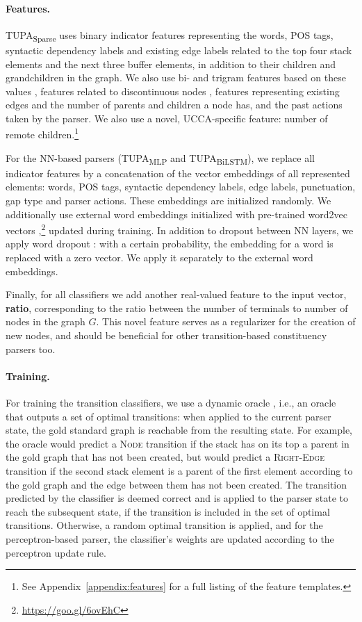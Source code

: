 \documentclass[11pt,a4paper]{article}
\newcommand{\parser}[1]{TUPA\textsubscript{#1}}
\begin{document}
\paragraph{Features.}
\parser{Sparse} uses binary indicator features representing
the words, POS tags, syntactic dependency labels and
existing edge labels related to the top four stack elements and the 
next three buffer elements, in addition to their children and grandchildren in the graph.
We also use bi- and trigram features based on these values \cite{zhang2009transition,zhu2013fast},
features related to discontinuous nodes
\cite[including separating punctuation and gap type]{maier2015discontinuous},
features representing existing edges and the number of parents and children a node has,
and the past actions taken by the parser.
We also use a novel, UCCA-specific feature:
number of remote children.\footnote{See
Appendix~\ref{appendix:features} for a full listing of the feature templates.}

For the NN-based parsers (\parser{MLP} and \parser{BiLSTM}),
we replace all indicator features by a
concatenation of the vector embeddings of all represented elements:
words, POS tags, syntactic dependency labels, edge labels, punctuation, gap type and parser actions.
These embeddings are initialized randomly.
We additionally use external word embeddings initialized with
pre-trained word2vec vectors \cite{mikolov2013efficient},\footnote{\url{
https://goo.gl/6ovEhC}} updated during training.
In addition to dropout between NN layers, we apply word dropout 
\cite{kiperwasser2016simple}: with a certain probability, the embedding for a
word is replaced with a zero vector. We apply it separately to the external
word embeddings.

Finally, for all classifiers we add another real-valued feature to the input vector,
\textbf{ratio}, corresponding to the ratio between the number of terminals to number of nodes
in the graph $G$.
This novel feature serves as a regularizer for the creation of new nodes,
and should be beneficial for other transition-based constituency parsers too.

\paragraph{Training.}
For training the transition classifiers, we use a dynamic oracle \cite{goldberg2012dynamic},
i.e., an oracle that outputs a set of optimal transitions: when
applied to the current parser state, the gold
standard graph is reachable from the resulting state.
For example, the oracle would predict a \textsc{Node} transition if the stack 
has on its top a parent in the gold graph that has not been created,
but would predict a \textsc{Right-Edge} transition if the second stack
element is a parent of the
first element according to the gold graph and the edge between them has not been created.
The transition predicted by the classifier is deemed correct
and is applied to the parser state to reach the subsequent state,
if the transition is included in the set of optimal transitions.
Otherwise, a random optimal transition is applied,
and for the perceptron-based parser, the classifier's weights are updated according
to the perceptron update rule.
\end{document}
